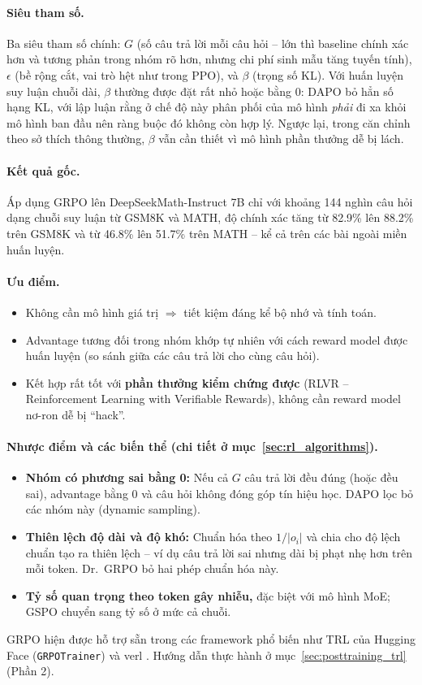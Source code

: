 \paragraph{Siêu tham số.}
Ba siêu tham số chính: $G$ (số câu trả lời mỗi câu hỏi -- lớn thì baseline chính xác hơn và tương phản trong nhóm rõ hơn, nhưng chi phí sinh mẫu tăng tuyến tính), $\epsilon$ (bề rộng cắt, vai trò hệt như trong PPO), và $\beta$ (trọng số KL). Với huấn luyện suy luận chuỗi dài, $\beta$ thường được đặt rất nhỏ hoặc bằng 0: DAPO \cite{yu2025dapo} bỏ hẳn số hạng KL, với lập luận rằng ở chế độ này phân phối của mô hình \emph{phải} đi xa khỏi mô hình ban đầu nên ràng buộc đó không còn hợp lý. Ngược lại, trong căn chỉnh theo sở thích thông thường, $\beta$ vẫn cần thiết vì mô hình phần thưởng dễ bị lách.

\paragraph{Kết quả gốc.} Áp dụng GRPO lên DeepSeekMath-Instruct 7B chỉ với khoảng 144 nghìn câu hỏi dạng chuỗi suy luận từ GSM8K và MATH, độ chính xác tăng từ 82.9\% lên 88.2\% trên GSM8K và từ 46.8\% lên 51.7\% trên MATH -- kể cả trên các bài ngoài miền huấn luyện.

\paragraph{Ưu điểm.}
\begin{itemize}
	\item Không cần mô hình giá trị $\Rightarrow$ tiết kiệm đáng kể bộ nhớ và tính toán.
	\item Advantage tương đối trong nhóm khớp tự nhiên với cách reward model được huấn luyện (so sánh giữa các câu trả lời cho cùng câu hỏi).
	\item Kết hợp rất tốt với \textbf{phần thưởng kiểm chứng được} (RLVR -- Reinforcement Learning with Verifiable Rewards), không cần reward model nơ-ron dễ bị “hack”.
\end{itemize}

\paragraph{Nhược điểm và các biến thể (chi tiết ở mục~\ref{sec:rl_algorithms}).}
\begin{itemize}
	\item \textbf{Nhóm có phương sai bằng 0:} Nếu cả $G$ câu trả lời đều đúng (hoặc đều sai), advantage bằng 0 và câu hỏi không đóng góp tín hiệu học. DAPO \cite{yu2025dapo} lọc bỏ các nhóm này (dynamic sampling).
	\item \textbf{Thiên lệch độ dài và độ khó:} Chuẩn hóa theo $1/|o_i|$ và chia cho độ lệch chuẩn tạo ra thiên lệch -- ví dụ câu trả lời sai nhưng dài bị phạt nhẹ hơn trên mỗi token. Dr.~GRPO \cite{liu2025drgrpo} bỏ hai phép chuẩn hóa này.
	\item \textbf{Tỷ số quan trọng theo token gây nhiễu,} đặc biệt với mô hình MoE; GSPO \cite{zheng2025gspo} chuyển sang tỷ số ở mức cả chuỗi.
\end{itemize}

GRPO hiện được hỗ trợ sẵn trong các framework phổ biến như TRL của Hugging Face (\texttt{GRPOTrainer}) và verl \cite{sheng2024hybridflow}. Hướng dẫn thực hành ở mục~\ref{sec:posttraining_trl} (Phần 2).
